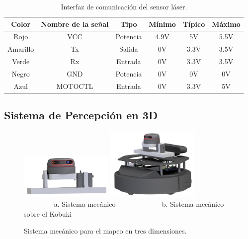 \begin{table}[htbp]
\begin{center}
\begin{tabular}{|c|c|c|c|c|c|}
	\hline
	Color & Nombre de la se\~nal & Tipo & M\'inimo & T\'ipico & M\'aximo \\ 
	\hline \hline
	Rojo & VCC & Potencia & 4.9V & 5V & 5.5V \\ \hline
	Amarillo & Tx & Salida & 0V & 3.3V & 3.5V \\ \hline
	Verde & Rx & Entrada & 0V & 3.3V & 3.5V \\ \hline
	Negro & GND & Potencia & 0V & 0V & 0V \\ \hline
	Azul & MOTOCTL & Entrada & 0V & 3.3V & 5V \\ \hline
\end{tabular}
	\caption{Interfaz de comunicaci\'on del sensor l\'aser.}
	\label{tbl:comunicacion}
\end{center}
\end{table}

\subsection{Sistema de Percepci\'on en 3D}
\begin{figure}%
  	\centering \footnotesize
  	\includegraphics[width=0.40\textwidth]{images/lidar_3d.png}
  	\includegraphics[width=0.40\textwidth]{images/lidar_wKbki.png}
  	\\ $\qquad\qquad$ a. Sistema mecánico  $\qquad\qquad\qquad$  b. Sistema mecánico sobre el Kobuki
  	\captionsetup{font=footnotesize}
  	\caption{Sistema mec\'anico para el mapeo en tres dimensiones.}
  	\label{f:lidar3D}
\end{figure}

